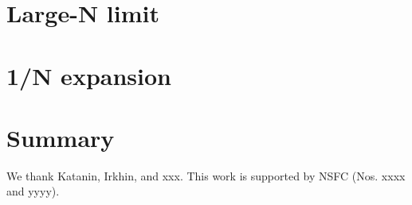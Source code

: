 \documentclass[aps,preprint,superscriptaddress]{revtex4-1}
\newcommand{\bea}{\begin{eqnarray}}
\newcommand{\eea}{\end{eqnarray}}
\begin{document}
\section{Large-N limit}

\section{1/N expansion}

\section{Summary}

\begin{acknowledge}
  We thank Katanin, Irkhin, and xxx.
  This work is supported by NSFC (Nos. xxxx and yyyy).
\end{acknowledge}


\end{document}
